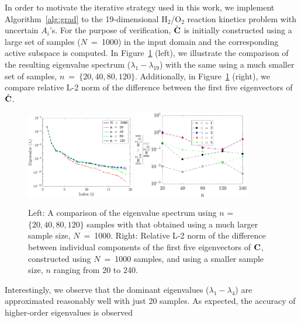 In order to motivate the iterative strategy used in this work, we implement Algorithm~\ref{alg:grad} to the
19-dimensional H$_2$/O$_2$ reaction kinetics problem with uncertain $A_i$'s. For the purpose of
verification, $\hat{\mathbf{{C}}}$ is initially constructed using a large set of samples ($N$~=~1000) in the input
domain and the corresponding active subspace is computed. In Figure~\ref{fig:eig_comp} (left), we illustrate
the comparison of the resulting eigenvalue spectrum ($\lambda_1 - \lambda_{19}$) with the same using a much 
smaller set of samples, $n$~=~$\{20,40,80,120\}$. Additionally, in Figure~\ref{fig:eig_comp} (right), we compare
relative L-2 norm of the difference between the first five eigenvectors of $\hat{\mathbf{{C}}}$.
%
\begin{figure}[htbp]
 \begin{center}
  \includegraphics[width=0.42\textwidth]{./Figures/eig_comp}
   \includegraphics[width=0.45\textwidth]{./Figures/err_eigv_1_5}
\caption{Left: A comparison of the eigenvalue spectrum using $n$ = $\{20,40,80,120\}$ samples with that
obtained using a much larger sample size, $N$~=~1000. Right: Relative L-2 norm of the difference between
individual components of the first five eigenvectors of $\mathbf{{C}}$, constructed using $N$~=~1000 samples,
and using a smaller sample size, $n$ ranging from 20 to 240.} 
\label{fig:eig_comp}
\end{center}
\end{figure}
%
Interestingly, we observe that the dominant eigenvalues ($\lambda_1 - \lambda_4$) are approximated 
reasonably well with just 20 samples. As expected, the accuracy of higher-order eigenvalues is observed
